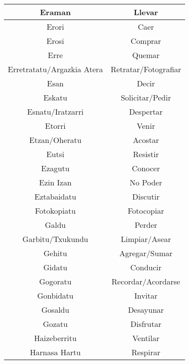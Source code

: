\documentclass[11pt, a4paper]{article}
\begin{document}
\begin{longtable}{cc}
\hline
Eraman                     & Llevar                      \\ 
\hline
Erori                      & Caer                        \\ 
\hline
Erosi                      & Comprar                     \\ 
\hline
Erre                       & Quemar                      \\ 
\hline
Erretratatu/Argazkia Atera & Retratar/Fotografiar        \\ 
\hline
Esan                       & Decir                       \\ 
\hline
Eskatu                     & Solicitar/Pedir             \\ 
\hline
Esnatu/Iratzarri           & Despertar                   \\ 
\hline
Etorri                     & Venir                       \\ 
\hline
Etzan/Oheratu              & Acostar                     \\ 
\hline
Eutsi                      & Resistir                    \\ 
\hline
Ezagutu                    & Conocer                     \\ 
\hline
Ezin Izan                  & No Poder                    \\ 
\hline
Eztabaidatu                & Discutir                    \\ 
\hline
Fotokopiatu                & Fotocopiar                  \\ 
\hline
Galdu                      & Perder                      \\ 
\hline
Garbitu/Txukundu           & Limpiar/Asear               \\ 
\hline
Gehitu                     & Agregar/Sumar               \\ 
\hline
Gidatu                     & Conducir                    \\ 
\hline
Gogoratu                   & Recordar/Acordarse          \\ 
\hline
Gonbidatu                  & Invitar                     \\ 
\hline
Gosaldu                    & Desayunar                   \\ 
\hline
Gozatu                     & Disfrutar                   \\ 
\hline
Haizeberritu               & Ventilar                    \\ 
\hline
Harnasa Hartu              & Respirar                    \\ 

\end{longtable}
\end{document}
